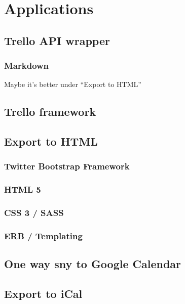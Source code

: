 
\chapter{Applications}
  \label{Applications}

\section{Trello API wrapper}

\subsection{Markdown}
Maybe it's better under \textquotedblleft Export to HTML\textquotedblright

\section{Trello framework}

\section{Export to HTML}

\subsection{Twitter Bootstrap Framework}

\subsection{HTML 5}

\subsection{CSS 3 / SASS}

\subsection{ERB / Templating}

\section{One way sny to Google Calendar}

\section{Export to iCal}


